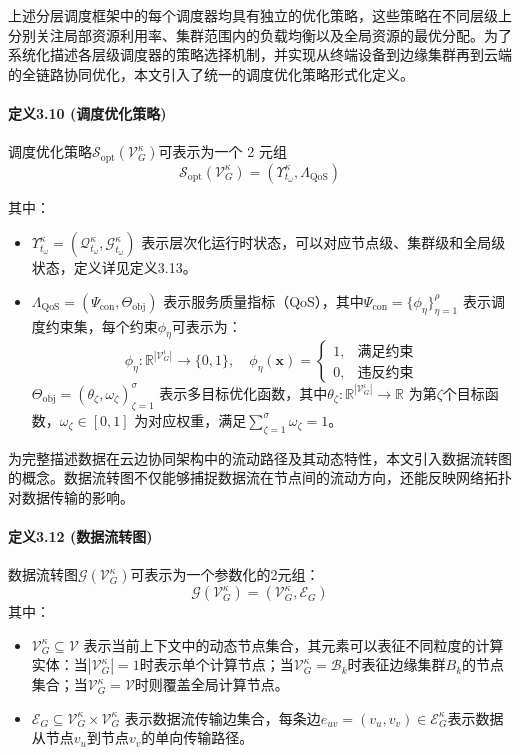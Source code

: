 上述分层调度框架中的每个调度器均具有独立的优化策略，这些策略在不同层级上分别关注局部资源利用率、集群范围内的负载均衡以及全局资源的最优分配。为了系统化描述各层级调度器的策略选择机制，并实现从终端设备到边缘集群再到云端的全链路协同优化，本文引入了统一的调度优化策略形式化定义。

\paragraph{定义3.10 (调度优化策略)} 调度优化策略$\mathcal{S}_{\text{opt}}(\mathcal{V}_G^κ)$可表示为一个 2 元组
\[
\mathcal{S}_{\text{opt}}(\mathcal{V}_G^κ) = (\Upsilon_{t_\omega}^κ, \Lambda_{\text{QoS}})
\]

其中：
\begin{itemize}
    \item $\Upsilon_{t_\omega}^κ = (\mathcal{Q}_{t_\omega}^κ, \mathcal{G}_{t_\omega}^κ)$ 表示层次化运行时状态，可以对应节点级、集群级和全局级状态，定义详见定义3.13。
    \item $\Lambda_{\text{QoS}} = (\Psi_{\text{con}}, \Theta_{\text{obj}})$ 表示服务质量指标（QoS），其中$\Psi_{\text{con}} = \{\phi_\eta\}_{\eta=1}^\rho$ 表示调度约束集，每个约束$\phi_\eta$可表示为：
        \[
        \phi_\eta: \mathbb{R}^{|\mathcal{V}_G^\iota|} \to \{0,1\}, \quad \phi_\eta(\mathbf{x}) = 
        \begin{cases}
            1, & \text{满足约束} \\
            0, & \text{违反约束}
        \end{cases}
        \]
    $\Theta_{\text{obj}} = (\theta_\zeta, \omega_\zeta)_{\zeta=1}^\sigma$ 表示多目标优化函数，其中$\theta_\zeta: \mathbb{R}^{|\mathcal{V}_G^\iota|} \to \mathbb{R}$ 为第$\zeta$个目标函数，$\omega_\zeta \in [0,1]$ 为对应权重，满足$\sum_{\zeta=1}^\sigma \omega_\zeta = 1$。
\end{itemize}

为完整描述数据在云边协同架构中的流动路径及其动态特性，本文引入数据流转图的概念。数据流转图不仅能够捕捉数据流在节点间的流动方向，还能反映网络拓扑对数据传输的影响。

\paragraph{定义3.12 (数据流转图)} 数据流转图$\mathcal{G}(\mathcal{V}_{G}^{κ})$可表示为一个参数化的2元组：
\[
\mathcal{G}(\mathcal{V}_{G}^{κ}) = (\mathcal{V}_{G}^{κ}, \mathcal{E}_G)
\]
其中：
\begin{itemize}
    \item $\mathcal{V}_{G}^{κ} \subseteq \mathcal{V}$ 表示当前上下文中的动态节点集合，其元素可以表征不同粒度的计算实体：当$|\mathcal{V}_{G}^{κ}|=1$时表示单个计算节点；当$\mathcal{V}_{G}^{κ} = \mathcal{B}_k$时表征边缘集群$B_k$的节点集合；当$\mathcal{V}_{G}^{κ} = \mathcal{V}$时则覆盖全局计算节点。
    \item $\mathcal{E}_G \subseteq \mathcal{V}_{G}^{κ} \times \mathcal{V}_{G}^{κ}$ 表示数据流传输边集合，每条边$e_{uv} = (v_u, v_v) \in \mathcal{E}_{G}^{κ}$表示数据从节点$v_u$到节点$v_v$的单向传输路径。
\end{itemize}

